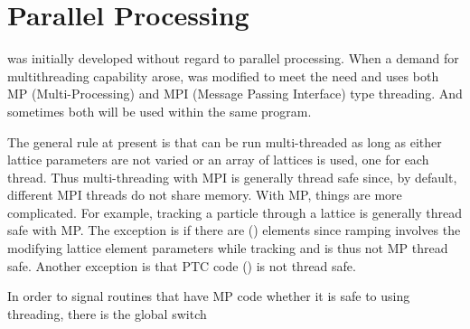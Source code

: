 {{{{{{{{{{{%
\section{Parallel Processing}
\label{s:parallel.proc}

\bmad was initially developed without regard to parallel processing. When a demand for
multithreading capability arose, \bmad was modified to meet the need and uses both MP
(Multi-Processing) and MPI (Message Passing Interface) type threading. And sometimes both will be
used within the same program.

The general rule at present is that \bmad can be run multi-threaded as long as either lattice
parameters are not varied or an array of lattices is used, one for each thread. Thus multi-threading
with MPI is generally thread safe since, by default, different MPI threads do not share memory. With
MP, things are more complicated.  For example, tracking a particle through a lattice is generally
thread safe with MP. The exception is if there are  () elements since
ramping involves the modifying lattice element parameters while tracking and is thus not MP thread
safe. Another exception is that PTC code () is not thread safe.

In order to signal routines that have MP code whether it is safe to using threading, there is the
global switch \vn{global_com%

\subsection{GPU Acceleration}
\label{s:gpu.accel}
\index{GPU tracking!parallel processing}
\index{CUDA!parallel processing}

In addition to CPU-based parallelism via MP and MPI, \bmad supports GPU-accelerated particle
tracking via NVIDIA CUDA (\sref{s:gpu.tracking}). When \vn{bmad_com%
\vn{True}, bunch tracking through eligible elements is offloaded to the GPU, where all particles in
a bunch are tracked in parallel by CUDA threads. Supported elements include drift, quadrupole
(with fringe), sbend (with misalignment), lcavity (relative and absolute time), pipe, monitor, and
instrument. Radiation damping/fluctuations, 3D FFT space charge, and 1D CSR are all supported on
GPU.

}}}}}}}}}}}}}
